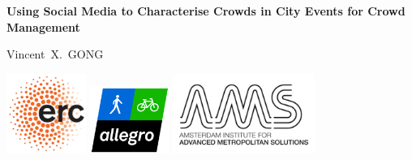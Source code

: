 \graphicspath{{./0-misc/images/}}



\newcommand{\thetitle}{Using Social Media to Characterise Crowds in City Events for Crowd Management} 
\newcommand{\thesubtitle}{} 
\newcommand{\theauthor}{Vincent\ X.\ GONG}


\pagestyle{fancy} %
\thispagestyle{empty}
\vspace*{30mm}

\begin{center}
    \textbf{\huge \thetitle}\\[\baselineskip]\textbf{\LARGE \thesubtitle}
\end{center}


\vspace{40mm}

\begin{center}
    \Large\theauthor
\end{center}

\newpage

\thispagestyle{empty}

\vspace*{\fill}

\noindent \includegraphics[width=7em]{erc.png}\hspace*{0.75cm}
\includegraphics[width=7em]{allegro.png}\hspace*{0.75cm}
\includegraphics[width=12.5em]{ams.png}\hspace*{0.75cm}\\

